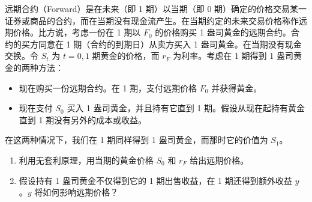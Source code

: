\begin{problem}
 远期合约（Forward）是在未来（即 1 期）以当期（即 0 期）确定的价格交易某一证券或商品的合约，而在当期没有现金流产生。在当期约定的未来交易价格称作远期价格。比方说，考虑一份在 1 期以 $F_{0}$ 的价格购买 1 盎司黄金的远期合约。合约的买方同意在 1 期（合约的到期日）从卖方买入 1 盎司黄金。在当期没有现金交换。令 $S_{t}$ 为 $t=0,1$ 期黄金的价格，而 $r_{F}$ 为利率。考虑在 1 期得到 1 盎司黄金的两种方法：
\begin{itemize}
    \item 现在购买一份远期合约。在 1 期，支付远期价格 $F_{0}$ 并获得黄金。
    \item 现在支付 $S_{0}$ 买入 1 盎司黄金，并且持有它直到 1 期。假设从现在起持有黄金直到 1 期没有另外的成本或收益。
\end{itemize}
在这两种情况下，我们在 1 期同样得到 1 盎司黄金，而那时它的价值为 $S_{1}$。
\begin{enumerate}[label=(\alph*)]
    \item 利用无套利原理，用当期的黄金价格 $S_{0}$ 和 $r_{F}$ 给出远期价格。
    \item 假设持有 1 盎司黄金不仅得到它的 1 期出售收益，在 1 期还得到额外收益 $y$。$y$ 将如何影响远期价格？
\end{enumerate}
\end{problem}

